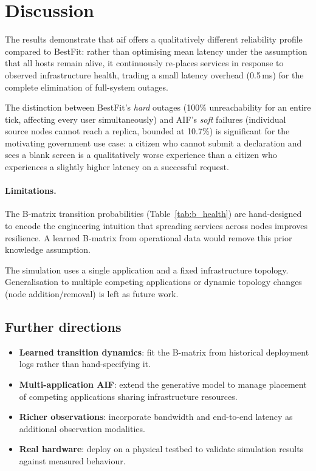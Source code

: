 \documentclass[11pt, a4paper]{article}
\begin{document}
\section{Discussion}
\label{sec:discussion}

The results demonstrate that \gls{aif} offers a qualitatively different
reliability profile compared to BestFit: rather than optimising mean latency
under the assumption that all hosts remain alive, it continuously re-places
services in response to observed infrastructure health, trading a small latency
overhead (0.5\,ms) for the complete elimination of full-system outages.

The distinction between BestFit's \emph{hard} outages (100\% unreachability
for an entire tick, affecting every user simultaneously) and AIF's \emph{soft}
failures (individual source nodes cannot reach a replica, bounded at 10.7\%) is
significant for the motivating government use case: a citizen who cannot submit
a declaration and sees a blank screen is a qualitatively worse experience than
a citizen who experiences a slightly higher latency on a successful request.

\paragraph{Limitations.}
The B-matrix transition probabilities (Table~\ref{tab:b_health}) are
hand-designed to encode the engineering intuition that spreading services
across nodes improves resilience.
A learned B-matrix from operational data would remove this prior knowledge
assumption.

The simulation uses a single application and a fixed infrastructure topology.
Generalisation to multiple competing applications or dynamic topology changes
(node addition/removal) is left as future work.

\subsection{Further directions}
\begin{itemize}
  \item \textbf{Learned transition dynamics}: fit the B-matrix from historical
        deployment logs rather than hand-specifying it.
  \item \textbf{Multi-application AIF}: extend the generative model to manage
        placement of competing applications sharing infrastructure resources.
  \item \textbf{Richer observations}: incorporate bandwidth and end-to-end
        latency as additional observation modalities.
  \item \textbf{Real hardware}: deploy on a physical testbed to validate
        simulation results against measured behaviour.
\end{itemize}
\end{document}
